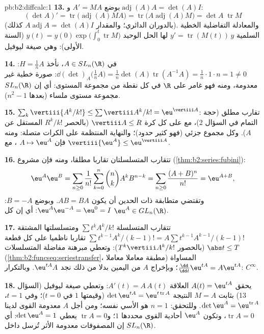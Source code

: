 \begin{solution}{pb:b2:diffcalc:1}
\textbf{13.} بوضع $A' = MA$ و$\operatorname{adj}(A)A = \det(A)I$:
\[
(\det A)' = \operatorname{tr}\bigl(\operatorname{adj}(A)MA
\bigr)
= \operatorname{tr}\bigl(A\operatorname{adj}(A)M\bigr)
= \det A\;\operatorname{tr}M
\]
(بالدوران الدائري؛ والمقدار $A\operatorname{adj}A = \det(A) I$ كذلك). والمعادلة التفاضلية
الخطية السلمية $y' = \operatorname{tr}(M(t))\,y$ لها الحل الوحيد
$y(t) = y(0)\exp\bigl(\int_0^t
\operatorname{tr}M\bigr)$ (السنة الأولى): وهي صيغة ليوفيل.

\textbf{14.} في $A \in SL_n(\R)$، نأخذ $H = \frac1nA$:
$\dd(\det)_A\bigl(\tfrac1nA\bigr) = \frac1n\det(A)
\operatorname{tr}(A^{-1}A) = \frac1n\cdot1\cdot n = 1 \neq 0$:
 صورة خطية غير معدومة، ومنه فهو غامر على $\R$ في كل نقطة
من مجموعة المستوى: أي إن $SL_n(\R)$ مجموعة مستوى ملساء (بعدها $n^2 - 1$).

\textbf{15.} $\sum_k\vertiii{A^k/k!} \leq
\sum\vertiii A^k/k! = \eu^{\vertiii A}$: تقارب مطلق (حجة التمام في السؤال 2)، مع  على كل كرة $\vertiii A \leq R$ (بالحصر $R^k/k!$ المستقل عن $A$). وكل مجموع
جزئي  (فهو كثير حدود)؛ والنهاية المنتظمة على الكرات متصلة:
ومنه فإن $A \mapsto \eu^A$ ، مع $\vertiii{\eu^A} \leq \eu^{\vertiii A}$.

\textbf{16.} تتقارب المتسلسلتان تقاربا مطلقا، ومنه فإن 
مشروع (\cref{thm:b2:series:fubini}):
\[
\eu^A\eu^B = \sum_{n\geq0}\frac{1}{n!}\sum_{k=0}^n\binom
nkA^kB^{n-k}
= \sum_{n\geq0}\frac{(A+B)^n}{n!} = \eu^{A+B},
\]
وتقتضي متطابقة ذات الحدين أن يكون $AB = BA$. وبوضع $B = -A$:
$\eu^A\eu^{-A} = \eu^0 = I$: أي إن كل $\eu^A \in GL_n(\R)$.

\textbf{17.} تتقارب المتسلسلة $\sum t^kA^k/k!$ ومتسلسلتها المشتقة $\sum t^{k-1}A^k/(k-1)! = A\sum t^{k-1}A^{k-1}/(k-1)!$
تقاربا ناظميا على كل قطعة $\abs t \leq T$ (بالحصور $T^k\vertiii A^k/k!$): وتعطي مبرهنة
مفاضلة المتسلسلات (\cref{thm:b2:funcseq:seriestransfer}، مطبقة معاملا معاملا)
المساواة $\frac{\dd}{\dd t}\eu^{tA} = A\eu^{tA}$؛ وبإخراج $A$ من اليمين بدلا من ذلك نجد $\eu^{tA}A$.
وبالتكرار: $C^\infty$.

\textbf{18.} يحقق $A(t) = \eu^{tA}$ العلاقة $A'(t) = A\,A(t)$: وتعطي صيغة ليوفيل (السؤال
13) بثابت $M = A$ النتيجة $\det\eu^{tA} = \eu^{t\operatorname{tr}A}$ (وقيمتها $1$ في $t =
0$)؛ وفي
$t = 1$، $\det\eu^A = \eu^{\operatorname{tr}A}$.
وللتحقق: $n = 1$ هو الأسي نفسه؛ ومن أجل $A$ معدومة القوى لدينا
$\operatorname{tr}A = 0$، وتكون $\eu^A$ أحادية القوى محددها $1$؛ و$\operatorname{tr}A = 0$ يعطي $\det\eu^A = 1$:
أي إن المصفوفات معدومة الأثر تُرسل داخل $SL_n(\R)$.


\end{solution}
